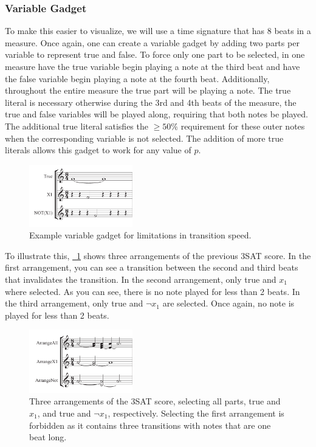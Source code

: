 \documentclass[11pt,letterpaper]{article}
\newcommand{\figref}[2][{}]{\hyperref[#2]{\figurename~\ref{#2}#1}}
\begin{document}
\subsubsection{Variable Gadget}
To make this easier to visualize, we will use a time signature that has 8 beats in a measure.
Once again, one can create a variable gadget by adding two parts per variable to represent true and false. To force only one part to be selected, in one measure have the true variable begin playing a note at the third beat and have the false variable begin playing a note at the fourth beat. Additionally, throughout the entire measure the true part will be playing a note. The true literal is necessary otherwise during the 3rd and 4th beats of the measure, the true and false variables will be played along, requiring that both notes be played. The additional true literal satisfies the $\ge50\%$ requirement for these outer notes when the corresponding variable is not selected. The addition of more true literals allows this gadget to work for any value of $p$.

\begin{figure}[h!]
  \centering
    \includegraphics[width=0.4\textwidth]{time2.pdf}
  \caption{Example variable gadget for limitations in transition speed.}
\end{figure}

To illustrate this, \figref{allspeed} shows three arrangements of the previous 3SAT score. In the first arrangement, you can see a transition between the second and third beats that invalidates the transition. In the second arrangement, only true and $x_1$ where selected. As you can see, there is no note played for less than 2 beats. In the third arrangement, only true and $\neg x_1$ are selected. Once again, no note is played for less than 2 beats.

\begin{figure}[h!]
  \centering
    \includegraphics[width=0.4\textwidth]{all2.pdf}
  \caption{Three arrangements of the 3SAT score, selecting all parts, true and $x_1$, and true and $\neg x_1$, respectively. Selecting the first arrangement is forbidden as it contains three transitions with notes that are one beat long. }
    \label{allspeed}
\end{figure}
 
\end{document}
